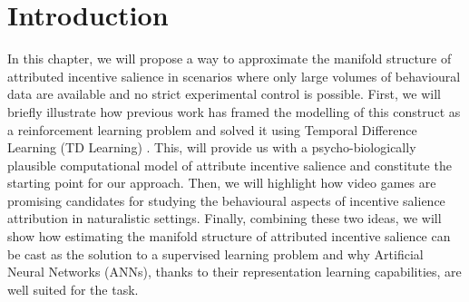 \section{Introduction}
In this chapter, we will propose a way to approximate the manifold structure of attributed incentive salience in scenarios where only large volumes of behavioural data are available and no strict experimental control is possible. First, we will briefly illustrate how previous work has framed the modelling of this construct as a reinforcement learning problem and solved it using Temporal Difference Learning (TD Learning) \cite{sutton1988learning}. This, will provide us with a psycho-biologically plausible computational model of attribute incentive salience and constitute the starting point for our approach. Then, we will highlight how video games are promising candidates for studying the behavioural aspects of incentive salience attribution in naturalistic settings. Finally, combining these two ideas, we will show how estimating the manifold structure of attributed incentive salience can be cast as the solution to a supervised learning problem and why Artificial Neural Networks (ANNs), thanks to their representation learning capabilities, are well suited for the task.


